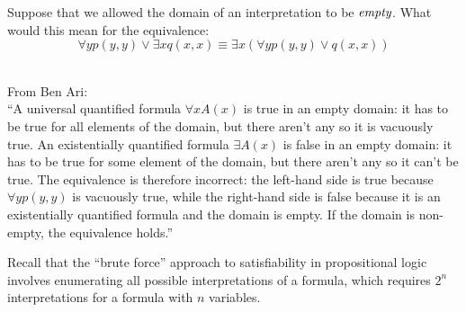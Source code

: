 \documentclass[]{exam}
\begin{document}
\begin{questions}
\question Suppose that we allowed the domain of an interpretation to be
$\emph{empty}$. What would this mean for the equivalence:
\[ \forall y p(y,y) \lor \exists x q(x,x) \equiv \exists x (\forall y p (y,y) \lor q(x,x))\]
\begin{solution}
~\\
From Ben Ari:\\
``A universal quantified formula $\forall xA(x)$ is true in an empty domain: it has to be true 
for all elements of the domain, but there aren’t any so it is vacuously true. An existentially 
quantified formula $\exists A(x)$ is false in an empty domain: it has to be true for some 
element of the domain, but there aren’t any so it can’t be true. The equivalence is therefore 
incorrect: the left-hand side is true because $\forall yp(y,y)$ is vacuously true, while the 
right-hand side is false because it is an existentially quantified formula and the domain is 
empty. If the domain is non-empty, the equivalence holds.''
\end{solution}

\question Recall that the ``brute force'' approach to satisfiability in
propositional logic involves enumerating all possible interpretations of a
formula, which requires $2^n$ interpretations for a formula with $n$ variables.
\end{questions}
\end{document}
